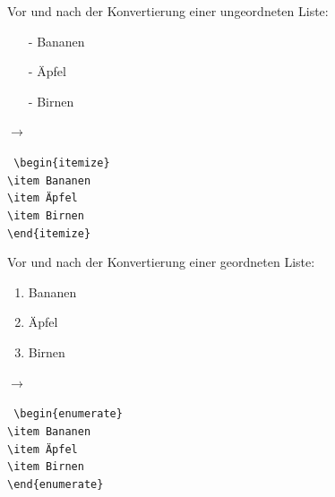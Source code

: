             Vor und nach der Konvertierung einer ungeordneten Liste: \\[5mm]
            \begin{minipage}[c]{0.45\textwidth}
                \begin{itemize}
                    \item[-] Bananen
                    \item[-] Äpfel
                    \item[-] Birnen
                \end{itemize}
            \end{minipage}
            \begin{minipage}[c]{0.1\textwidth}
                $\longrightarrow$
            \end{minipage}
            \begin{minipage}[c]{0.45\textwidth}
                \texttt{\noindent
                    \textbackslash{}begin\{itemize\} \\
                    \textbackslash{}item Bananen \\
                    \textbackslash{}item Äpfel \\
                    \textbackslash{}item Birnen \\
                    \textbackslash{}end\{itemize\}
                }
            \end{minipage}

            Vor und nach der Konvertierung einer geordneten Liste: \\[5mm]
            \begin{minipage}[c]{0.45\textwidth}
                \begin{enumerate}
                    \item Bananen
                    \item Äpfel
                    \item Birnen
                \end{enumerate}
            \end{minipage}
            \begin{minipage}[c]{0.1\textwidth}
                $\longrightarrow$
            \end{minipage}
            \begin{minipage}[c]{0.45\textwidth}
                \texttt{\noindent
                    \textbackslash{}begin\{enumerate\} \\
                    \textbackslash{}item Bananen \\
                    \textbackslash{}item Äpfel \\
                    \textbackslash{}item Birnen \\
                \textbackslash{}end\{enumerate\}
                }
            \end{minipage}

